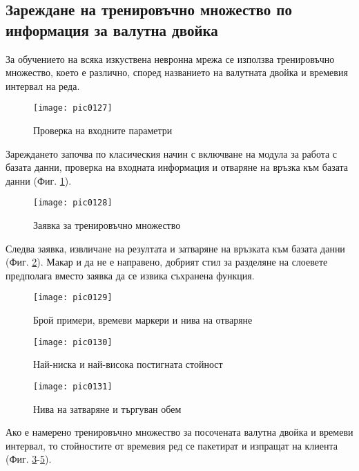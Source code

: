 \subsection{Зареждане на тренировъчно множество по информация за валутна двойка}

За обучението на всяка изкуствена невронна мрежа се използва тренировъчно множество, което е различно, според названието на валутната двойка и времевия интервал на реда. 

\begin{figure}[h]
  \centering
  \texttt{[image: pic0127]}
  \caption{Проверка на входните параметри}
\label{fig:pic0127}
\end{figure}
\FloatBarrier

Зареждането започва по класическия начин с включване на модула за работа с базата данни, проверка на входната информация и отваряне на връзка към базата данни (Фиг. \ref{fig:pic0127}).

\begin{figure}[h]
  \centering
  \texttt{[image: pic0128]}
  \caption{Заявка за тренировъчно множество}
\label{fig:pic0128}
\end{figure}
\FloatBarrier

Следва заявка, извличане на резултата и затваряне на връзката към базата данни (Фиг. \ref{fig:pic0128}). Макар и да не е направено, добрият стил за разделяне на слоевете предполага вместо заявка да се извика съхранена функция. 

\begin{figure}[h]
  \centering
  \texttt{[image: pic0129]}
  \caption{Брой примери, времеви маркери и нива на отваряне}
\label{fig:pic0129}
\end{figure}
\FloatBarrier

\begin{figure}[h]
  \centering
  \texttt{[image: pic0130]}
  \caption{Най-ниска и най-висока постигната стойност}
\label{fig:pic0130}
\end{figure}
\FloatBarrier

\begin{figure}[h]
  \centering
  \texttt{[image: pic0131]}
  \caption{Нива на затваряне и търгуван обем}
\label{fig:pic0131}
\end{figure}
\FloatBarrier

Ако е намерено тренировъчно множество за посочената валутна двойка и времеви интервал, то стойностите от времевия ред се пакетират и изпращат на клиента (Фиг. \ref{fig:pic0129}-\ref{fig:pic0131}).

